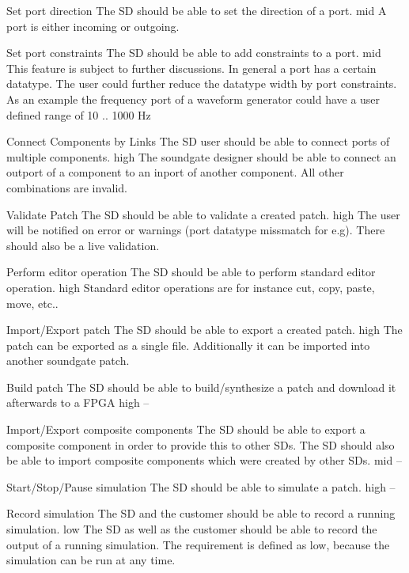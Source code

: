 	{Set port direction}
	{The SD should be able to set the direction of a port.}
	{mid}
	{A port is either incoming or outgoing.}
	
	{Set port constraints}
	{The SD should be able to add constraints to a port.}
	{mid}
	{This feature is subject to further discussions. In general a port has a certain datatype. The user could further reduce the datatype width by port constraints. As an example the frequency port of a waveform generator could have a user defined range of 10 .. 1000 Hz }
	
	{Connect Components by Links}
	{The SD user should be able to connect ports of multiple components.}
	{high}
	{The soundgate designer should be able to connect an outport of a component to an inport of another component. All other combinations are invalid.}
	
	{Validate Patch}
	{The SD should be able to validate a created patch.}
	{high}
	{The user will be notified on error or warnings (port datatype missmatch for e.g). There should also be a live validation.}
	
	{Perform editor operation}
	{The SD should be able to perform standard editor operation.}
	{high}
	{Standard editor operations are for instance cut, copy, paste, move, etc..}
	
	{Import/Export patch}
	{The SD should be able to export a created patch.}
	{high}
	{The patch can be exported as a single file. Additionally it can be imported into another soundgate patch.}
	
	{Build patch}
	{The SD should be able to build/synthesize a patch and download it afterwards to a FPGA}
	{high}
	{--}
	
	{Import/Export composite components}
	{The SD should be able to export a composite component in order to provide this to other SDs. The SD should also be able to import composite components which were created by other SDs.}
	{mid}
	{--}
	
	{Start/Stop/Pause simulation}
	{The SD should be able to simulate a patch.}
	{high}
	{--}
	
	{Record simulation}
	{The SD and the customer should be able to record a running simulation.}
	{low}
	{The SD as well as the customer should be able to record the output of a running simulation. The requirement is defined as low, because the simulation can be run at any time.}
	
